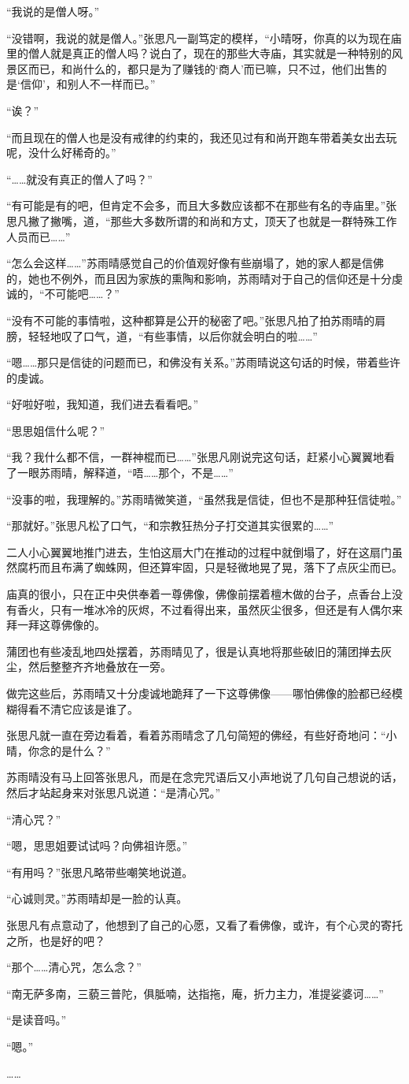 “我说的是僧人呀。”

“没错啊，我说的就是僧人。”张思凡一副笃定的模样，“小晴呀，你真的以为现在庙里的僧人就是真正的僧人吗？说白了，现在的那些大寺庙，其实就是一种特别的风景区而已，和尚什么的，都只是为了赚钱的‘商人’而已嘛，只不过，他们出售的是‘信仰’，和别人不一样而已。”

“诶？”

“而且现在的僧人也是没有戒律的约束的，我还见过有和尚开跑车带着美女出去玩呢，没什么好稀奇的。”

“……就没有真正的僧人了吗？”

“有可能是有的吧，但肯定不会多，而且大多数应该都不在那些有名的寺庙里。”张思凡撇了撇嘴，道，“那些大多数所谓的和尚和方丈，顶天了也就是一群特殊工作人员而已……”

“怎么会这样……”苏雨晴感觉自己的价值观好像有些崩塌了，她的家人都是信佛的，她也不例外，而且因为家族的熏陶和影响，苏雨晴对于自己的信仰还是十分虔诚的，“不可能吧……？”

“没有不可能的事情啦，这种都算是公开的秘密了吧。”张思凡拍了拍苏雨晴的肩膀，轻轻地叹了口气，道，“有些事情，以后你就会明白的啦……”

“嗯……那只是信徒的问题而已，和佛没有关系。”苏雨晴说这句话的时候，带着些许的虔诚。

“好啦好啦，我知道，我们进去看看吧。”

“思思姐信什么呢？”

“我？我什么都不信，一群神棍而已……”张思凡刚说完这句话，赶紧小心翼翼地看了一眼苏雨晴，解释道，“唔……那个，不是……”

“没事的啦，我理解的。”苏雨晴微笑道，“虽然我是信徒，但也不是那种狂信徒啦。”

“那就好。”张思凡松了口气，“和宗教狂热分子打交道其实很累的……”

二人小心翼翼地推门进去，生怕这扇大门在推动的过程中就倒塌了，好在这扇门虽然腐朽而且布满了蜘蛛网，但还算牢固，只是轻微地晃了晃，落下了点灰尘而已。

庙真的很小，只在正中央供奉着一尊佛像，佛像前摆着檀木做的台子，点香台上没有香火，只有一堆冰冷的灰烬，不过看得出来，虽然灰尘很多，但还是有人偶尔来拜一拜这尊佛像的。

蒲团也有些凌乱地四处摆着，苏雨晴见了，很是认真地将那些破旧的蒲团掸去灰尘，然后整整齐齐地叠放在一旁。

做完这些后，苏雨晴又十分虔诚地跪拜了一下这尊佛像——哪怕佛像的脸都已经模糊得看不清它应该是谁了。

张思凡就一直在旁边看着，看着苏雨晴念了几句简短的佛经，有些好奇地问：“小晴，你念的是什么？”

苏雨晴没有马上回答张思凡，而是在念完咒语后又小声地说了几句自己想说的话，然后才站起身来对张思凡说道：“是清心咒。”

“清心咒？”

“嗯，思思姐要试试吗？向佛祖许愿。”

“有用吗？”张思凡略带些嘲笑地说道。

“心诚则灵。”苏雨晴却是一脸的认真。

张思凡有点意动了，他想到了自己的心愿，又看了看佛像，或许，有个心灵的寄托之所，也是好的吧？

“那个……清心咒，怎么念？”

“南无萨多南，三藐三普陀，俱胝喃，达指拖，庵，折力主力，准提娑婆诃……”

“是读音吗。”

“嗯。”

……

